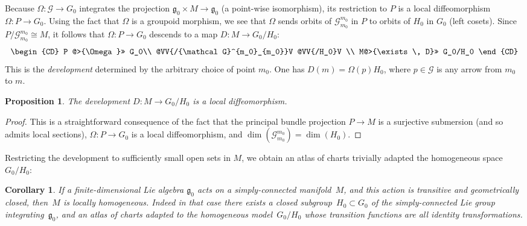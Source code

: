 \documentclass[pdftex]{sigma}
\DeclareMathOperator{\dimension}{dim}
\numberwithin{equation}{section}
\newtheorem{CorollaryBlaom}[TheoremBlaom]{Corollary}
\newtheorem{PropositionBlaom}[TheoremBlaom]{Proposition}
 { \theoremstyle{definition}
\newtheorem{CounterexampleBlaom}[TheoremBlaom]{Counterexample}
\newtheorem{RemarkBlaom}[TheoremBlaom]{Remark} }
\begin{document}
Because $\Omega \colon {\mathcal G} \rightarrow G_0$ integrates the
projection ${\mathfrak g}_0 \times M \rightarrow {\mathfrak g}_0$ (a
point-wise isomorphism), its restriction to $P$ is a local
dif\/feomorphism $\Omega \colon P\rightarrow G_0$. Using the fact that
$\Omega$ is a groupoid morphism, we see that $\Omega$ sends orbits of
${\mathcal G}^{m_0}_{m_0}$ in $P$ to orbits of $H_0$ in $G_0$ (left
cosets). Since $P/{\mathcal G}^{m_0}_{m_0}\cong M$, it follows that
$\Omega\colon P\rightarrow G_0$ descends to a map $D \colon
M\rightarrow G_0/H_0$:
\begin{gather*}
  \begin{CD}
    P   @>{\Omega}>> G_0\\
    @VV{/{\mathcal G}^{m_0}_{m_0}}V @VV{/H_0}V \\
    M@>{\exists\, D}>> G_0/H_0
  \end{CD}
\end{gather*}
This is the {\it development} determined by the arbitrary choice of
point $m_0$. One has $D(m)=\Omega(p)H_0$, where $p \in {\mathcal G}$
is any arrow from $m_0$ to $m$.
\begin{PropositionBlaom}\label{Proposition4.3}
  The development $D \colon M \rightarrow {G_0/H_0}$ is a local
  diffeomorphism.
\end{PropositionBlaom}

\begin{proof}
  This is a straightforward consequence of the fact that the principal
  bundle projection $P \rightarrow M$ is a surjective submersion (and
  so admits local sections), $\Omega \colon P \rightarrow G_0$ is a
  local dif\/feomorphism, and $\dimension ({\mathcal
    G}^{m_0}_{m_0})=\dimension (H_0)$.
\end{proof}

Restricting the development to suf\/f\/iciently small open sets in $M$, we
obtain an atlas of charts trivially adapted the homogeneous space
${G_0/H_0}$:
\begin{CorollaryBlaom}\label{Corollary4.4}
  If a finite-dimensional Lie algebra ${\mathfrak g}_0$ acts on a
  simply-connected manifold~$M$, and this action is transitive and
  geometrically closed, then~$M$ is locally homogeneous. Indeed in
  that case there exists a closed subgroup~$H_0 \subset G_0$ of the
  simply-connected Lie group integrating~${\mathfrak g}_0$, and an
  atlas of charts adapted to the homogeneous model~$G_0/H_0$ whose
  transition functions are all identity transformations.
\end{CorollaryBlaom}
\end{document}

